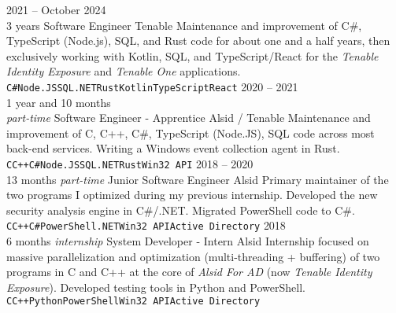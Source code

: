 \documentclass[8pt]{developercv} %
\begin{document}
\begin{entrylist}
	\entry
		{2021 -- October 2024\\\footnotesize{3 years}}
		{Software Engineer}
		{Tenable}
		{
			Maintenance and improvement of C\#, TypeScript (Node.js), SQL, and Rust code for about one and a half years, then exclusively working with Kotlin,
			SQL, and TypeScript/React for the \emph{Tenable Identity Exposure} and \emph{Tenable One} applications.\\
			\texttt{C\#}\slashsep\texttt{Node.JS}\slashsep\texttt{SQL}\slashsep\texttt{.NET}\slashsep\texttt{Rust}\slashsep\texttt{Kotlin}\slashsep\texttt{TypeScript}\slashsep\texttt{React}
		}
	\entry
		{2020 -- 2021\\\footnotesize{1 year and 10 months\\\emph{part-time}}}
		{Software Engineer - Apprentice}
		{Alsid / Tenable}
		{
			Maintenance and improvement of C, C++, C\#, TypeScript (Node.JS), SQL code across most back-end services. Writing a Windows event collection agent in Rust\footnotemark[1].\\
			\texttt{C}\slashsep\texttt{C++}\slashsep\texttt{C\#}\slashsep\texttt{Node.JS}\slashsep\texttt{SQL}\slashsep\texttt{.NET}\slashsep\texttt{Rust}\slashsep\texttt{Win32 API}
		}
	\entry
		{2018 -- 2020\\\footnotesize{13 months \emph{part-time}}}
		{Junior Software Engineer}
		{Alsid}
		{
			Primary maintainer of the two programs I optimized during my previous internship. Developed the new security analysis engine in C\#/.NET. Migrated PowerShell code to C\#.\\
			\texttt{C}\slashsep\texttt{C++}\slashsep\texttt{C\#}\slashsep\texttt{PowerShell}\slashsep\texttt{.NET}\slashsep\texttt{Win32 API}\slashsep\texttt{Active Directory}
		}
	\entry
		{2018\\\footnotesize{6 months \emph{internship}}}
		{System Developer  - Intern}
		{Alsid}
		{
			Internship focused on massive parallelization and optimization (multi-threading + buffering) of two programs in C and C++ at the core of \emph{Alsid For AD} (now \emph{Tenable Identity Exposure}).
			Developed testing tools in Python and PowerShell.\\
			\texttt{C}\slashsep\texttt{C++}\slashsep\texttt{Python}\slashsep\texttt{PowerShell}\slashsep\texttt{Win32 API}\slashsep\texttt{Active Directory}
		}
\end{entrylist}

\vfill %
\end{document}
